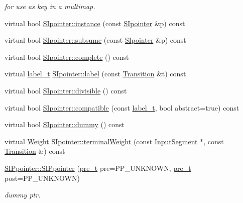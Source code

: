 \begin{DoxyCompactItemize}
\begin{DoxyCompactList}\small\item\em for use as key in a multimap. \end{DoxyCompactList}\item 
virtual bool \mbox{\hyperlink{group__table_ga259b23462f7e87f6df0e9361c1884618}{S\+Ipointer\+::instance}} (const \mbox{\hyperlink{classSIpointer}{S\+Ipointer}} \&p) const
\item 
virtual bool \mbox{\hyperlink{group__table_gaa50fe6e651b28c77839ddfaf1bbdcd4f}{S\+Ipointer\+::subsume}} (const \mbox{\hyperlink{classSIpointer}{S\+Ipointer}} \&p) const
\item 
virtual bool \mbox{\hyperlink{group__table_ga638627bc96caa0f1dbf7093f0f70951b}{S\+Ipointer\+::complete}} () const
\item 
virtual \mbox{\hyperlink{group__output_ga22fde970e635fcf63962743b2d5c441d}{label\+\_\+t}} \mbox{\hyperlink{group__table_ga6bdbea8e7013194f834be17932efe642}{S\+Ipointer\+::label}} (const \mbox{\hyperlink{classTransition}{Transition}} \&t) const
\item 
virtual bool \mbox{\hyperlink{group__table_gac83e0619c17ce4efd589f73513706a6b}{S\+Ipointer\+::divisible}} () const
\item 
virtual bool \mbox{\hyperlink{group__table_gaca7d3c4d141ecf2874a5e5512e0c02ff}{S\+Ipointer\+::compatible}} (const \mbox{\hyperlink{group__output_ga22fde970e635fcf63962743b2d5c441d}{label\+\_\+t}}, bool abstract=true) const
\item 
virtual bool \mbox{\hyperlink{group__table_ga555753e41af94ac201a0c8c99babb83b}{S\+Ipointer\+::dummy}} () const
\item 
virtual \mbox{\hyperlink{classWeight}{Weight}} \mbox{\hyperlink{group__table_ga6b46b59b3b465ba6a995f76ff34970ce}{S\+Ipointer\+::terminal\+Weight}} (const \mbox{\hyperlink{classInputSegment}{Input\+Segment}} $\ast$, const \mbox{\hyperlink{classTransition}{Transition}} \&) const
\item 
\mbox{\hyperlink{group__table_gac498892cd08ebd0663899dc82b00fac6}{S\+I\+Ppointer\+::\+S\+I\+Ppointer}} (\mbox{\hyperlink{group__general_ga092fe8b972dfa977c2a0886720a7731e}{pre\+\_\+t}} pre=P\+P\+\_\+\+U\+N\+K\+N\+O\+WN, \mbox{\hyperlink{group__general_ga092fe8b972dfa977c2a0886720a7731e}{pre\+\_\+t}} post=P\+P\+\_\+\+U\+N\+K\+N\+O\+WN)
\begin{DoxyCompactList}\small\item\em dummy ptr. \end{DoxyCompactList}\item 

\end{DoxyCompactItemize}
